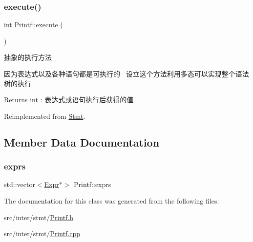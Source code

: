 \subsubsection{\texorpdfstring{execute()}{execute()}}
{\footnotesize\ttfamily int Printf\+::execute (\begin{DoxyParamCaption}{ }\end{DoxyParamCaption})\hspace{0.3cm}{\ttfamily [virtual]}}



抽象的执行方法 

因为表达式以及各种语句都是可执行的~\newline
设立这个方法利用多态可以实现整个语法树的执行~\newline
 \begin{DoxyReturn}{Returns}
int \+: 表达式或语句执行后获得的值 
\end{DoxyReturn}


Reimplemented from \hyperlink{class_stmt_abdc3261770c3c5bd3ce5b3ba6eedfaa4}{Stmt}.



\subsection{Member Data Documentation}
\mbox{\label{class_printf_ab07a181eb9cd79c9018e172332d44ce5}} 
\subsubsection{\texorpdfstring{exprs}{exprs}}
{\footnotesize\ttfamily std\+::vector$<$\hyperlink{class_expr}{Expr}$\ast$$>$ Printf\+::exprs}



The documentation for this class was generated from the following files\+:\begin{DoxyCompactItemize}
\item 
src/inter/stmt/\hyperlink{_printf_8h}{Printf.\+h}\item 
src/inter/stmt/\hyperlink{_printf_8cpp}{Printf.\+cpp}\end{DoxyCompactItemize}
